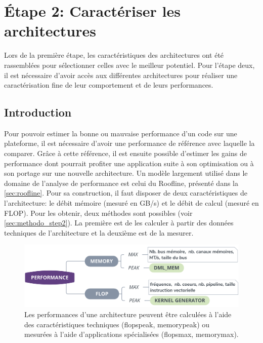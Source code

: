 \section{Étape 2: Caractériser les architectures}\label{sec:methodo_step2}

Lors de la première étape, les caractéristiques des architectures ont été rassemblées pour sélectionner celles avec le meilleur potentiel. Pour l'étape deux, il est nécessaire d'avoir accès aux différentes architectures pour réaliser une caractérisation fine de leur comportement et de leurs performances.

\subsection{Introduction}

        
        Pour pouvoir estimer la bonne ou mauvaise performance d'un code sur une plateforme, il est nécessaire d'avoir une performance de référence avec laquelle la comparer. Grâce à cette référence, il est ensuite possible d'estimer les gains de performance dont pourrait profiter une application suite à son optimisation ou à son portage sur une nouvelle architecture. Un modèle largement utilisé dans le domaine de l'analyse de performance est celui du Roofline, présenté dans la \autoref{sec:roofline}. Pour sa construction, il faut disposer de deux caractéristiques de l'architecture: le débit mémoire (mesuré en GB/s) et le débit de calcul (mesuré en \gls{FLOP}). Pour les obtenir, deux méthodes sont possibles (voir \autoref{sec:methodo_step2}). La première est de les calculer à partir des données techniques de l'architecture et la deuxième est de la mesurer.
        
        \begin{figure}[h!]
        \center
        \includegraphics[width=14cm]{images/methodo_step2.png}
        \caption{\label{pic:methodo_step2} Les performances d'une architecture peuvent être calculées à l'aide des caractéristiques techniques (\gls{flopspeak}, \gls{memorypeak}) ou mesurées à l'aide d'applications spécialisées (\gls{flopsmax}, \gls{memorymax}).}
        \end{figure}


